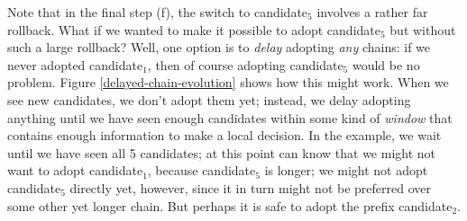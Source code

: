 Note that in the final step (f), the switch to candidate$_5$ involves a
rather far rollback. What if we wanted to make it possible to adopt
candidate$_5$ but without such a large rollback? Well, one option is to
\emph{delay} adopting \emph{any} chains: if we never adopted candidate$_1$,
then of course adopting candidate$_5$ would be no problem. Figure
\cref{delayed-chain-evolution} shows how this might work. When we see new
candidates, we don't adopt them yet; instead, we delay adopting anything until
we have seen enough candidates within some kind of \emph{window} that contains
enough information to make a local decision. In the example, we wait until
we have seen all 5 candidates; at this point can know that we might not want
to adopt candidate$_1$, because candidate$_5$ is longer; we might not adopt
candidate$_5$ directly yet, however, since it in turn might not be preferred
over some other yet longer chain. But perhaps it is safe to adopt the
prefix candidate$_2$.

